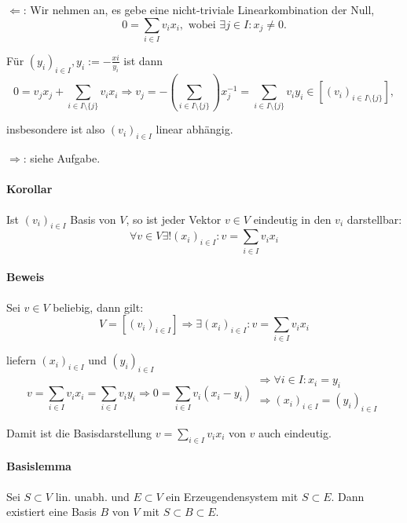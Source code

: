	$\Leftarrow$: Wir nehmen an, es gebe eine nicht-triviale Linearkombination der Null,
	\begin{equation*}
		0 = \sum_{i\in I} v_ix_i, \text{ wobei } \exists j\in I: x_j \neq 0.
	\end{equation*}

	Für $(y_i)_{i\in I}, y_i := - \frac{xi}{y_i}$ ist dann
	\begin{equation*}
		0 = v_jx_j + \sum_{i\in I\setminus\{j\}} v_ix_i \Rightarrow v_j = -(\sum_{i\in I\setminus\{j\}})x_j^{-1} = \sum_{i\in I\setminus\{j\}} v_iy_i \in [(v_i)_{i\in I\setminus\{j\}}],
	\end{equation*}

	insbesondere ist also $(v_i)_{i\in I}$ linear abhängig.

	$\Rightarrow$: siehe Aufgabe.
	
\paragraph{Korollar}
	Ist $(v_i)_{i\in I}$ Basis von $ V $, so ist jeder Vektor $v\in V$ eindeutig in den $v_i$ darstellbar:
	\begin{equation*}
		\forall v\in V \exists! (x_i)_{i\in I}: v = \sum_{i\in I} v_ix_i
	\end{equation*}

\paragraph{Beweis}
	Sei $v\in V$ beliebig, dann gilt:
	\begin{equation*}
		V = [(v_i)_{i\in I}] \Rightarrow \exists (x_i)_{i\in I}: v = \sum_{i\in I} v_ix_i
	\end{equation*}

	liefern $(x_i)_{i\in I}$ und $(y_i)_{i\in I}$
	\begin{equation*}
		v = \sum_{i\in I} v_ix_i = \sum_{i\in I}v_iy_i \Rightarrow 0 = \sum_{i\in I} v_i(x_i-y_i)
		\begin{array}{l}
			\Rightarrow \forall i\in I: x_i = y_i\\
			\Rightarrow (x_i)_{i\in I} = (y_i)_{i\in I}
		\end{array}
	\end{equation*}

	Damit ist die Basisdarstellung $v = \sum_{i\in I} v_ix_i$ von $ v $ auch eindeutig.


\paragraph{Basislemma}
    Sei $S\subset V$ lin. unabh. und $E\subset V$ ein Erzeugendensystem mit $S\subset E$. Dann existiert eine Basis $B$ von $V$ mit $S\subset B\subset E$.

